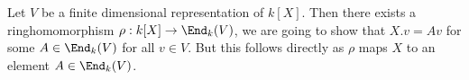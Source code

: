 Let $V$ be a finite dimensional representation of $k[X]$. Then there exists a ringhomomorphism $\rho: k[X] \to \End_k(V)$, we are going to show that $X.v = Av$ for some $A \in \End_k(V)$ for all $v\in V$. But this follows directly as $\rho$ maps $X$ to an element $A\in \End_k(V)$. 